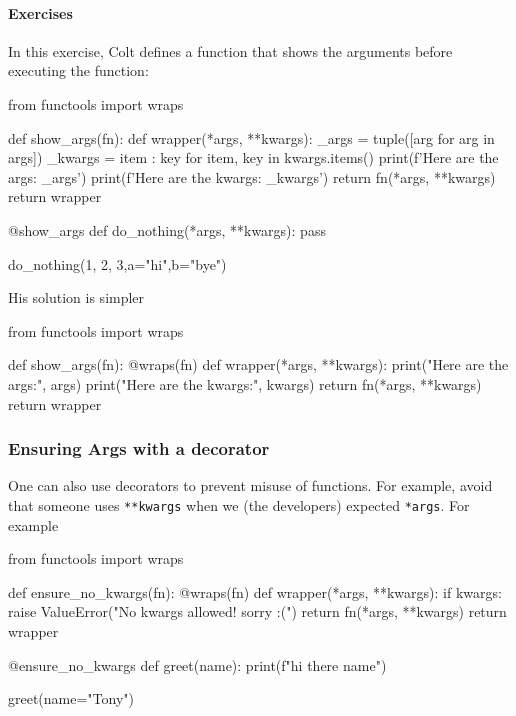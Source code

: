\paragraph{Exercises} In this exercise, Colt defines a function that shows the arguments before executing the function: 
\begin{listing}{1}
from functools import wraps    

def show_args(fn):
    def wrapper(*args, **kwargs):
        _args = tuple([arg for arg in args])
        _kwargs = {item : key for item, key in kwargs.items()}
        print(f'Here are the args: {_args}')
        print(f'Here are the kwargs: {_kwargs}')
        return fn(*args, **kwargs)
    return wrapper
        
@show_args
def do_nothing(*args, **kwargs):
    pass

do_nothing(1, 2, 3,a="hi",b="bye")    
\end{listing}

His solution is simpler 
\begin{listing}{1}
from functools import wraps

def show_args(fn):
    @wraps(fn)
    def wrapper(*args, **kwargs):
        print("Here are the args:", args)
        print("Here are the kwargs:", kwargs)
        return fn(*args, **kwargs)
    return wrapper    
\end{listing}

\subsubsection{Ensuring Args with a decorator}

One can also use decorators to prevent misuse of functions. For example, avoid that someone uses \verb|**kwargs| when we (the developers) expected \verb|*args|. For example 
\begin{listing}{1}
from functools import wraps

def ensure_no_kwargs(fn):
    @wraps(fn)
    def wrapper(*args, **kwargs):
        if kwargs:
            raise ValueError("No kwargs allowed! sorry :(")
        return fn(*args, **kwargs)
    return wrapper

@ensure_no_kwargs
def greet(name):
    print(f"hi there {name}")

greet(name="Tony")    
\end{listing}


